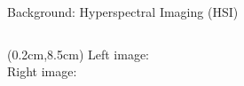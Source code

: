 \documentclass[aspectratio=169,xcolor=dvipsnames]{beamer}
\begin{document}
\begin{frame}{Background: Hyperspectral Imaging (HSI)}
\begin{columns}
\begin{column}{0.48\textwidth}
            \begin{textblock*}{5cm}(0.2cm,8.5cm)
                \tiny Left image: \cite{hsi-cube} \\ Right image: \cite{nat-presentation}
            \end{textblock*}
            
        \end{column}
    \end{columns}
\end{frame}

\end{document}
